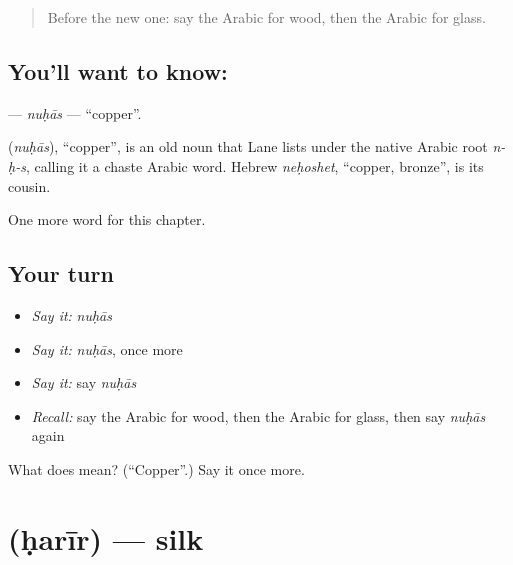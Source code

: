 \label{lesson:AR-C219-nuhas}



\begin{quote}
Before the new one: say the Arabic for wood, then the Arabic for glass.
\end{quote}

\subsection*{You'll want to know: }
\textbf{} — \emph{nuḥās} — \textquotedblleft{}copper\textquotedblright{}.

\begin{cousinweb}
\textbf{} (\emph{nuḥās}), \textquotedblleft{}copper\textquotedblright{}, is an old noun that Lane lists under the native Arabic root \emph{n-ḥ-s}, calling it a chaste Arabic word. Hebrew \emph{neḥoshet}, \textquotedblleft{}copper, bronze\textquotedblright{}, is its cousin.
\end{cousinweb}

\begin{grammarlens}[title={What you've built}]
One more word for this chapter.
\end{grammarlens}

\subsection*{Your turn}
\begin{itemize}
\raggedright
  \item \emph{Say it:} \emph{nuḥās}
  \item \emph{Say it:} \emph{nuḥās}, once more
  \item \emph{Say it:} say \emph{nuḥās}
  \item \emph{Recall:} say the Arabic for wood, then the Arabic for glass, then say \emph{nuḥās} again
\end{itemize}

\begin{tcolorbox}[breakable,colback=teal!4,colframe=teal!35!black,title={Before you move on}]
What does  mean? (\textquotedblleft{}Copper\textquotedblright{}.) Say it once more.
\end{tcolorbox}
\section[\texorpdfstring{\ar{حرير} (ḥarīr)}{حرير (ḥarīr)}]{ (ḥarīr) — silk}

